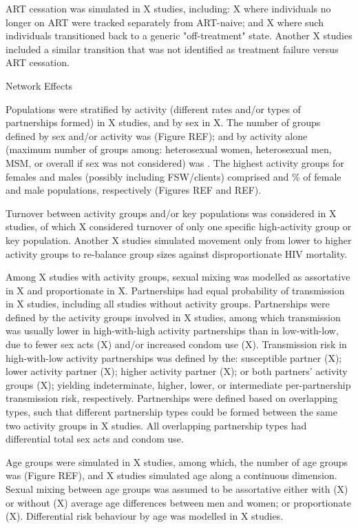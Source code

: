 ART cessation was simulated in X studies, including:
X where individuals no longer on ART
were tracked separately from ART-naive; and
X where such individuals
transitioned back to a generic "off-treatment" state.
Another X studies included a similar transition
that was not identified as treatment failure versus ART cessation.

Network Effects

Populations were stratified by activity (different rates and/or types of partnerships formed)
in X studies, and by sex in X.
The number of groups defined by sex and/or activity was   (Figure REF);
and by activity alone (maximum number of groups among:
heterosexual women, heterosexual men, MSM, or overall if sex was not considered) was .
The highest activity groups for females and males (possibly including FSW/clients) comprised
 and \% of female and male populations, respectively
(Figures REF and REF).

Turnover between activity groups and/or key populations
was considered in X studies,
of which X considered turnover of only
one specific high-activity group or key population.
Another X studies simulated
movement only from lower to higher activity groups
to re-balance group sizes against disproportionate HIV mortality.

Among X studies with activity groups, sexual mixing was modelled as
assortative in X and proportionate in X.
Partnerships had equal probability of transmission in X studies,
including all studies without activity groups.
Partnerships were defined by the activity groups involved in X studies,
among which transmission was usually
lower in high-with-high activity partnerships than in low-with-low, due to
fewer sex acts (X) and/or increased condom use (X).
Transmission risk in high-with-low activity partnerships was defined by the:
susceptible partner (X);
lower activity partner (X);
higher activity partner (X); or
both partners' activity groups (X);
yielding indeterminate, higher, lower, or intermediate
per-partnership transmission risk, respectively.
Partnerships were defined based on overlapping types, such that
different partnership types could be formed between the same two activity groups in X studies.
All overlapping partnership types had differential total sex acts and condom use.

Age groups were simulated in X studies, among which,
the number of age groups was  (Figure REF),
and X studies simulated age along a continuous dimension.
Sexual mixing between age groups was assumed to be assortative
either with (X) or without (X)
average age differences between men and women;
or proportionate (X).
Differential risk behaviour by age was modelled in X studies.

